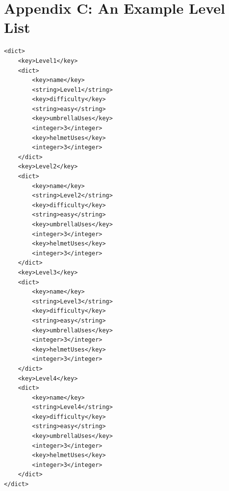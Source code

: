 \documentclass[a4paper,oneside]{report}
\begin{document}
\section{Appendix C: An Example Level List}
\begin{lstlisting}
<dict>
	<key>Level1</key>
	<dict>
		<key>name</key>
		<string>Level1</string>
		<key>difficulty</key>
		<string>easy</string>
		<key>umbrellaUses</key>
		<integer>3</integer>
		<key>helmetUses</key>
		<integer>3</integer>
	</dict>
	<key>Level2</key>
	<dict>
		<key>name</key>
		<string>Level2</string>
		<key>difficulty</key>
		<string>easy</string>
		<key>umbrellaUses</key>
		<integer>3</integer>
		<key>helmetUses</key>
		<integer>3</integer>
	</dict>
	<key>Level3</key>
	<dict>
		<key>name</key>
		<string>Level3</string>
		<key>difficulty</key>
		<string>easy</string>
		<key>umbrellaUses</key>
		<integer>3</integer>
		<key>helmetUses</key>
		<integer>3</integer>
	</dict>
	<key>Level4</key>
	<dict>
		<key>name</key>
		<string>Level4</string>
		<key>difficulty</key>
		<string>easy</string>
		<key>umbrellaUses</key>
		<integer>3</integer>
		<key>helmetUses</key>
		<integer>3</integer>
	</dict>
</dict>
\end{lstlisting}
\newpage
\end{document}
